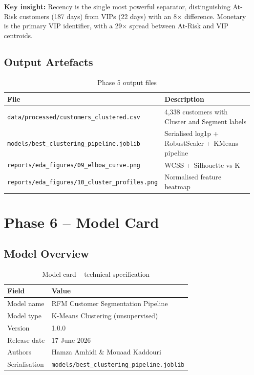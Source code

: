 \documentclass[12pt,a4paper]{report}
\begin{document}
\textbf{Key insight:} Recency is the single most powerful separator, distinguishing At-Risk customers (187 days) from VIPs (22 days) with an 8$\times$ difference. Monetary is the primary VIP identifier, with a 29$\times$ spread between At-Risk and VIP centroids.

\section{Output Artefacts}

\begin{table}[H]
\centering
\caption{Phase 5 output files}
\begin{tabular}{ll}
\toprule
\textbf{File} & \textbf{Description} \\
\midrule
\texttt{data/processed/customers\_clustered.csv} & 4,338 customers with Cluster and Segment labels \\
\texttt{models/best\_clustering\_pipeline.joblib} & Serialised log1p + RobustScaler + KMeans pipeline \\
\texttt{reports/eda\_figures/09\_elbow\_curve.png} & WCSS + Silhouette vs K \\
\texttt{reports/eda\_figures/10\_cluster\_profiles.png} & Normalised feature heatmap \\
\bottomrule
\end{tabular}
\end{table}

\chapter{Phase 6 -- Model Card}

\section{Model Overview}

\begin{table}[H]
\centering
\caption{Model card -- technical specification}
\begin{tabularx}{\textwidth}{lX}
\toprule
\textbf{Field} & \textbf{Value} \\
\midrule
Model name & RFM Customer Segmentation Pipeline \\
Model type & K-Means Clustering (unsupervised) \\
Version & 1.0.0 \\
Release date & 17 June 2026 \\
Authors & Hamza Amhidi \& Mouaad Kaddouri \\
Serialisation & \texttt{models/best\_clustering\_pipeline.joblib} \\
\bottomrule
\end{tabularx}
\end{table}
\end{document}
